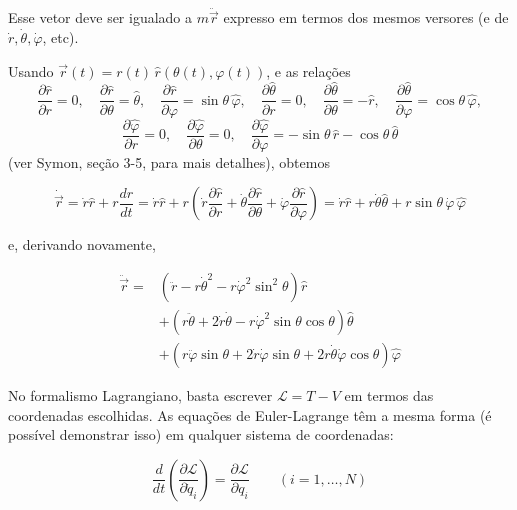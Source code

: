 \begin{enumerate}
Esse vetor deve ser igualado a $m\ddot{\vec{r}}$ expresso em termos dos mesmos versores (e de $\dot{r}, \dot{\theta}, \dot{\varphi}$, etc).

Usando $\vec{r}(t) = r(t)\,\hat{r}(\theta(t), \varphi(t))$, e as relações
\[
\frac{\partial \hat{r}}{\partial r} = 0, \quad
\frac{\partial \hat{r}}{\partial \theta} = \hat{\theta}, \quad
\frac{\partial \hat{r}}{\partial \varphi} = \sin\theta\,\hat{\varphi}, \quad
\frac{\partial \hat{\theta}}{\partial r} = 0, \quad
\frac{\partial \hat{\theta}}{\partial \theta} = -\hat{r}, \quad
\frac{\partial \hat{\theta}}{\partial \varphi} = \cos\theta\,\hat{\varphi},
\]
\[
\frac{\partial \hat{\varphi}}{\partial r} = 0, \quad
\frac{\partial \hat{\varphi}}{\partial \theta} = 0, \quad
\frac{\partial \hat{\varphi}}{\partial \varphi} = -\sin\theta\,\hat{r} - \cos\theta\,\hat{\theta}
\]
(ver Symon, seção 3-5, para mais detalhes), obtemos

\begin{equation}
\dot{\vec{r}} = \dot{r}\hat{r} + r\frac{d\hat{r}}{dt} = \dot{r}\hat{r} + r\left(\dot{r}\frac{\partial \hat{r}}{\partial r} + \dot{\theta}\frac{\partial \hat{r}}{\partial \theta} + \dot{\varphi}\frac{\partial \hat{r}}{\partial \varphi}\right) = \dot{r}\hat{r} + r\dot{\theta}\hat{\theta} + r\sin\theta\,\dot{\varphi}\,\hat{\varphi}
\label{eq:aula8_velocidade_esferica}
\end{equation}

e, derivando novamente,

\begin{align}
\ddot{\vec{r}} = {}& \left(\ddot{r} - r\dot{\theta}^2 - r\dot{\varphi}^2 \sin^2\theta\right)\hat{r} \nonumber \\
& + \left(r\ddot{\theta} + 2\dot{r}\dot{\theta} - r\dot{\varphi}^2 \sin\theta\cos\theta\right)\hat{\theta} \nonumber \\
& + \left(r\ddot{\varphi}\sin\theta + 2\dot{r}\dot{\varphi}\sin\theta + 2r\dot{\theta}\dot{\varphi}\cos\theta\right)\hat{\varphi}
\label{eq:aula8_aceleracao_esferica}
\end{align}

No formalismo Lagrangiano, basta escrever $\mathcal{L} = T - V$ em termos das coordenadas escolhidas. As equações de Euler-Lagrange têm a mesma forma (é possível demonstrar isso) em qualquer sistema de coordenadas:

\begin{equation}
\frac{d}{dt}\left(\frac{\partial \mathcal{L}}{\partial \dot{q}_i}\right) = \frac{\partial \mathcal{L}}{\partial q_i} \qquad (i = 1, \dots, N)
\label{eq:aula8_el_geral}
\end{equation}


\end{enumerate}
